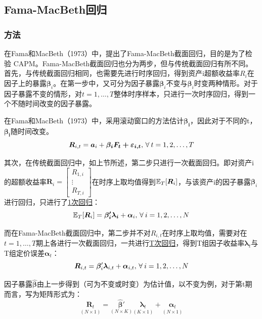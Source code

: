 \documentclass[11pt]{article}
\begin{document}
\subsection{Fama-MacBeth回归}

\subsubsection{方法}

在Fama和MacBeth（1973）中，提出了Fama-MacBeth截面回归，目的是为了检验 CAPM。Fama-MacBeth截面回归也分为两步，但与传统截面回归有所不同。首先，与传统截面回归相同，也需要先进行时序回归，得到资产i超额收益率$R_i$在因子上的暴露$\bm{\beta}_i$。在第一步中，又可分为因子暴露$\bm{\beta}_i$不变与$\bm{\beta}_i$时变两种情形。对于因子暴露不变的情形，对$t=1,\dots,T$整体时序样本，只进行一次时序回归，得到一个不随时间改变的因子暴露。

在Fama和MacBeth（1973）中，采用滚动窗口的方法估计$\bm{\beta_i}$，因此对于不同的t，$\bm{\beta_i}$随时间改变。
\begin{equation*}
    \bm{R}_{i,t} = \bm{a}_i + \bm{\beta_{i} \bm{F}_t + \bm{\varepsilon}_{i,t}} \ilsep \forall t=1,2,\dots,T
\end{equation*}

其次，在传统截面回归中，如上节所述，第二步只进行一次截面回归。即对资产i的超额收益率$\bm{R}_i = \begin{bmatrix} R_{1,i} \\ \vdots \\ R_{T,i} \end{bmatrix}$在时序上取均值得到$\mathbb{E}_T[\bm{R}_i]$，与该资产i的因子暴露$\bm{\beta}_i$进行回归，只进行了\uline{1次回归}：
\begin{equation*}
    \E_T[\bm{R}_i] = \bm{\beta_{i}' \lambda_i} + \bm{\alpha}_i \ilsep \forall i=1,2,\dots,N
\end{equation*}

而在Fama-MacBeth截面回归中，第二步并不对$R_{i,t}$在时序上取均值，需要对在$t=1,\dots,T$期上各进行一次截面回归，一共进行\uline{T次回归}，得到T组因子收益率$\bm{\lambda}_t$与T组定价误差$\bm{\alpha}_t$：
\begin{equation*}
    \bm{R}_{i,t} = \bm{\beta}_{i}' \bm{\lambda}_{i,t} + \bm{\alpha}_{i,t} \ilsep \forall i=1,2,\dots,N
\end{equation*}

因子暴露$\hat{\bm{\beta}}$由上一步得到（可为不变或时变）为估计值，以不变为例，对于第t期而言，写为矩阵形式为：
\begin{equation*}
    \underset{\scriptscriptstyle{(N \times 1)}}{\bm{R}_t} = \underset{\scriptscriptstyle{(N \times K)}}{\hat{\bm{\beta}}'} \underset{\scriptscriptstyle{(K \times 1)}}{\bm{\lambda}_t} + \underset{\scriptscriptstyle{(N \times 1)}}{\bm{\alpha}_t}
\end{equation*}
\end{document}
